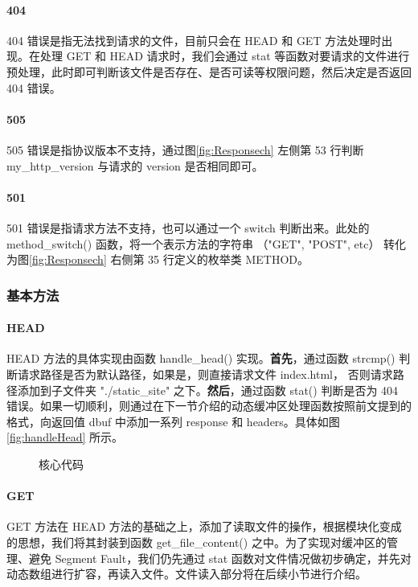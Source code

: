 \paragraph*{404}
404 错误是指无法找到请求的文件，目前只会在 HEAD 和 GET 方法处理时出现。在处理 GET 和 HEAD 请求时，我们会通过 stat 等函数对要请求的文件进行预处理，此时即可判断该文件是否存在、是否可读等权限问题，然后决定是否返回 404 错误。

\paragraph*{505}
505 错误是指协议版本不支持，通过图\ref{fig:Responsech} 左侧第 53 行判断 my\_http\_version 与请求的 version 是否相同即可。

\paragraph*{501}

501 错误是指请求方法不支持，也可以通过一个 switch 判断出来。此处的 method\_switch() 函数，将一个表示方法的字符串 （"GET", "POST", etc） 转化为图\ref{fig:Responsech} 右侧第 35 行定义的枚举类 METHOD。


\subsubsection{基本方法}

\paragraph*{HEAD} HEAD 方法的具体实现由函数 handle\_head() 实现。\textbf{首先}，通过函数 strcmp() 判断请求路径是否为默认路径，如果是，则直接请求文件 index.html， 否则请求路径添加到子文件夹 "./static\_site" 之下。\textbf{然后}，通过函数 stat() 判断是否为 404 错误。如果一切顺利，则通过在下一节介绍的动态缓冲区处理函数按照前文提到的格式，向返回值 dbuf 中添加一系列 response 和 headers。具体如图\ref{fig:handleHead} 所示。


\begin{figure}[htbp!]
    \centering
    \caption{核心代码}\label{fig:Main}
\end{figure}

\paragraph*{GET} GET 方法在 HEAD 方法的基础之上，添加了读取文件的操作，根据模块化变成的思想，我们将其封装到函数 get\_file\_content() 之中。为了实现对缓冲区的管理、避免 Segment Fault，我们仍先通过 stat 函数对文件情况做初步确定，并先对动态数组进行扩容，再读入文件。文件读入部分将在后续小节进行介绍。

